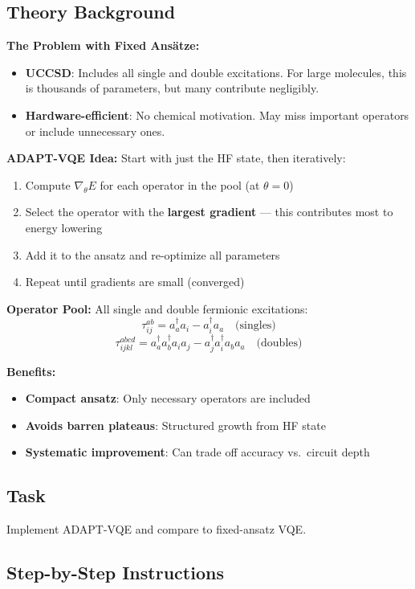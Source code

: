 \documentclass[11pt,a4paper]{article}
\begin{document}
\subsection*{Theory Background}
\textbf{The Problem with Fixed Ansätze:}
\begin{itemize}
    \item \textbf{UCCSD}: Includes all single and double excitations. For large molecules, this is thousands of parameters, but many contribute negligibly.
    \item \textbf{Hardware-efficient}: No chemical motivation. May miss important operators or include unnecessary ones.
\end{itemize}

\textbf{ADAPT-VQE Idea:}
Start with just the HF state, then iteratively:
\begin{enumerate}
    \item Compute $\nabla_\theta E$ for each operator in the pool (at $\theta = 0$)
    \item Select the operator with the \textbf{largest gradient} --- this contributes most to energy lowering
    \item Add it to the ansatz and re-optimize all parameters
    \item Repeat until gradients are small (converged)
\end{enumerate}

\textbf{Operator Pool:} All single and double fermionic excitations:
\[
\tau_{ij}^{ab} = a_a^\dagger a_i - a_i^\dagger a_a \quad \text{(singles)}
\]
\[
\tau_{ijkl}^{abcd} = a_a^\dagger a_b^\dagger a_i a_j - a_j^\dagger a_i^\dagger a_b a_a \quad \text{(doubles)}
\]

\textbf{Benefits:}
\begin{itemize}
    \item \textbf{Compact ansatz}: Only necessary operators are included
    \item \textbf{Avoids barren plateaus}: Structured growth from HF state
    \item \textbf{Systematic improvement}: Can trade off accuracy vs.\ circuit depth
\end{itemize}

\subsection*{Task}
Implement ADAPT-VQE and compare to fixed-ansatz VQE.

\subsection*{Step-by-Step Instructions}
\end{document}
